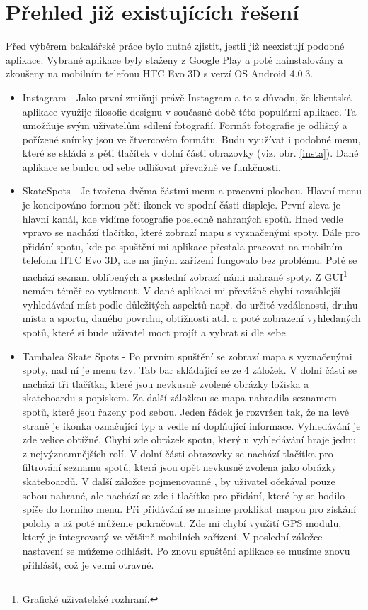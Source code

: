 \documentclass[12pt]{article}
\begin{document}
\section{Přehled již existujících řešení}
Před výběrem bakalářské práce bylo nutné zjistit, jestli již
neexistují podobné aplikace. Vybrané aplikace byly staženy z Google Play a poté nainstalovány a zkoušeny na mobilním telefonu HTC Evo 3D s verzí OS Android 4.0.3.
\begin{itemize}
\item Instagram - Jako první zmiňuji právě Instagram a to z důvodu, že klientská aplikace využije filosofie designu v současné době této populární aplikace. Ta umožňuje svým uživatelům sdílení fotografií. Formát fotografie je odlišný a pořízené snímky jsou ve čtvercovém formátu. Budu využívat i podobné menu, které se  skládá z pěti tlačítek v dolní části obrazovky (viz. obr. \ref{insta}). Dané aplikace se budou od sebe odlišovat převažně ve funkčnosti.

\item SkateSpots - Je tvořena dvěma částmi menu a pracovní plochou. Hlavní menu je koncipováno formou pěti ikonek ve spodní části displeje. První zleva je hlavní kanál, kde vidíme fotografie posledně nahraných spotů. Hned vedle vpravo se nachází tlačítko, které zobrazí mapu s vyznačenými spoty. Dále pro přidání spotu, kde po spuštění mi aplikace přestala pracovat na mobilním telefonu HTC Evo 3D, ale na jiným zařízení fungovalo bez problému. Poté se nachází seznam oblíbených a poslední zobrazí námi nahrané spoty. Z GUI\footnote[4]{Grafické uživatelské rozhraní.} nemám téměř co vytknout. V dané aplikaci mi převážně chybí rozsáhlejší vyhledávání míst podle důležitých aspektů např. do určité vzdálenosti, druhu místa a sportu, daného povrchu, obtížnosti atd. a poté zobrazení vyhledaných spotů, které si bude uživatel moct projít a vybrat si dle sebe.

\item Tambalea Skate Spots - Po prvním spuštění se zobrazí mapa s vyznačenými spoty, nad ní je menu tzv. Tab bar skládající se ze 4 záložek. V dolní části se nachází tři tlačítka, které jsou nevkusně zvolené obrázky ložiska a skateboardu s popiskem. Za další záložkou se mapa nahradila seznamem spotů, které jsou řazeny pod sebou. Jeden řádek je rozvržen tak, že na levé straně je ikonka označující typ a vedle ní doplňující informace. Vyhledávání je zde velice obtížné. Chybí zde obrázek spotu, který u vyhledávání hraje jednu z nejvýznamnějších rolí. V dolní části obrazovky se nachází tlačítka pro filtrování seznamu spotů, která jsou opět nevkusně zvolena jako obrázky skateboardů. V další záložce pojmenovanné , by uživatel očekával pouze sebou nahrané, ale nachází se zde i tlačítko pro přidání, které by se hodilo spíše do horního menu. Při přidávání se musíme proklikat mapou pro získání polohy a až poté můžeme pokračovat. Zde mi chybí využití GPS modulu, který je integrovaný ve většině mobilních zařízení. V poslední záložce nastavení se můžeme odhlásit. Po znovu spuštění aplikace se musíme znovu přihlásit, což je velmi otravné.
\end{itemize}
\end{document}

